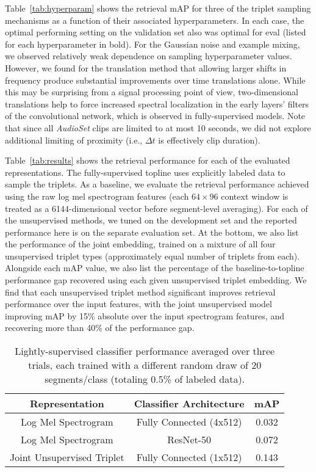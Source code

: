 \documentclass{article}
\begin{document}
Table~\ref{tab:hyperparam} shows the retrieval mAP for three of the triplet
sampling mechanisms as a function of their associated hyperparameters.   In each
case, the optimal performing setting on the validation set also was optimal for
eval (listed for each hyperparameter in bold).  For the Gaussian noise and
example mixing, we observed relatively weak dependence on sampling
hyperparameter values.  However, we found for the translation method that
allowing larger shifts in frequency produce substantial improvements over time
translations alone.  While this may be surprising from a signal processing point
of view, two-dimensional translations help to force increased spectral
localization in the early layers' filters of the convolutional network, which is
observed in fully-supervised models.  Note that since all \emph{AudioSet} clips
are limited to at most 10 seconds, we did not explore additional limiting of
proximity (i.e., $\Delta t$ is effectively clip duration).

Table~\ref{tab:results} shows the retrieval performance for each of the
evaluated representations.  The fully-supervised topline uses explicitly labeled
data to sample the triplets.  As a baseline, we evaluate the retrieval
performance achieved using the raw log mel spectrogram features (each
$64\!\times\!96$ context window is treated as a 6144-dimensional vector before
segment-level averaging).  For each of the unsupervised methods, we tuned on the
development set and the reported performance here is on the separate evaluation
set.  At the bottom, we also list the performance of the joint embedding,
trained on a mixture of all four unsupervised triplet types (approximately equal
number of triplets from each).  Alongside each mAP value, we also list the
percentage of the baseline-to-topline performance gap recovered using each given
unsupervised triplet embedding.  We find that each unsupervised triplet method
significant improves retrieval performance over the input features, with the
joint unsupervised model improving mAP by 15\% absolute over the input
spectrogram features, and recovering more than 40\% of the performance gap.

\begin{table}
\vspace{-0.2cm}
  \centering
  \caption{Lightly-supervised classifier performance averaged over three trials,
    each trained with a different random draw of 20 segments/class (totaling
    0.5\% of labeled data).}
  \label{tab:light}
    \vspace{0.2cm}
  \begin{tabular}{c|c|c}
    \hline  \hline
    Representation & Classifier Architecture & mAP \\
    \hline  \hline
    Log Mel Spectrogram & Fully Connected (4x512) & 0.032 \\
    Log Mel Spectrogram & ResNet-50               & 0.072 \\
    \hline
    Joint Unsupervised Triplet & Fully Connected (1x512) & 0.143 \\
    \hline  \hline
  \end{tabular}
\vspace{-0.2cm}
\end{table}
\end{document}
